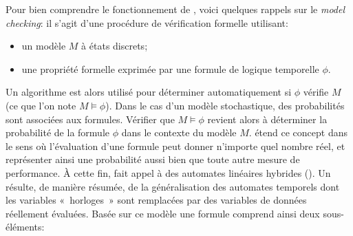Pour bien comprendre le fonctionnement de \lsah, voici quelques rappels sur le \textit{model checking}: il s'agit d'une procédure de vérification formelle utilisant:
\begin{itemize}
    \item un modèle $M$ à états discrets;
    \item une propriété formelle exprimée par une formule de logique temporelle $\phi$.
\end{itemize}
Un algorithme est alors utilisé pour déterminer automatiquement si $\phi$ vérifie $M$ (ce que l'on note $M\models\phi$).
Dans le cas d'un modèle stochastique, des probabilités sont associées aux formules.
Vérifier que $M\models\phi$ revient alors à déterminer la probabilité de la formule $\phi$ dans le contexte du modèle $M$.
\lsah étend ce concept dans le sens où l'évaluation d'une formule peut donner n'importe quel nombre réel, et représenter ainsi une probabilité aussi bien que toute autre mesure de performance.
À cette fin, \lsah fait appel à des automates linéaires hybrides (\alh).
Un \alh résulte, de manière résumée, de la généralisation des automates temporels dont les variables «~horloges~» sont remplacées par des variables de données réellement évaluées.
Basée sur ce modèle une formule \lsah comprend ainsi deux sous-éléments:
